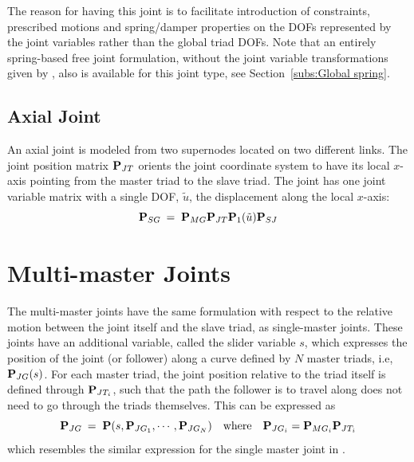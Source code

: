 The reason for having this joint is to facilitate introduction of constraints,
prescribed motions and spring/damper properties on the DOFs represented by the
joint variables rather than the global triad DOFs.
Note that an entirely spring-based free joint formulation, without the joint
variable transformations given by ,
also is available for this joint type, see Section~\ref{subs:Global spring}.


\subsection{Axial Joint}

An axial joint is modeled from two supernodes located on two different links.
The joint position matrix ${\bf P}_{JT}$ orients the joint coordinate system
to have its local $x$-axis pointing from the master triad to the slave triad.
The joint has one joint variable matrix with a single DOF, $\tilde u$,
the displacement along the local $x$-axis:
%
\begin{equation}
{\bf P}_{SG} \:=\; {\bf P}_{MG}{\bf P}_{JT}
{\bf P}_1(\tilde u)
{\bf P}_{SJ}
\end{equation}


\section{Multi-master Joints}

The multi-master joints have the same formulation with respect to the relative
motion between the joint itself and the slave triad, as single-master joints.
These joints have an additional variable, called the slider variable $s$,
which expresses the position of the joint (or follower) along a curve defined
by $N$ master triads, i.e, ${\bf P}_{JG}(s)$.
For each master triad, the joint position relative to the triad itself is
defined through ${\bf P}_{JT_i}$, such that the path the follower is to travel
along does not need to go through the triads themselves.
This can be expressed as
%
\begin{equation}
{\bf P}_{JG} \:=\; {\bf P}(s,{\bf P}_{JG_1},\cdots,{\bf P}_{JG_N})
\quad\text{where}\quad{\bf P}_{JG_i} = {\bf P}_{MG_i}{\bf P}_{JT_i}
\label{eq:FollowerFunction}
\end{equation}
%
which resembles the similar expression for the single master joint in
.

